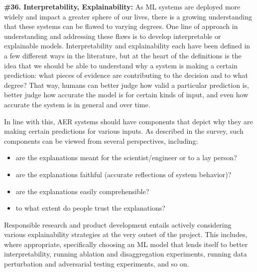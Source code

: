 \documentclass{clv3}
\begin{document}
\noindent \textbf{\#36. Interpretability, Explainability:} As ML systems are deployed more widely and impact a greater sphere of our lives, there is a growing understanding that these systems can be flawed to varying degrees. One line of approach in understanding and addressing these flaws is to develop interpretable or explainable models. Interpretability and explainability each have been defined in a few different ways in the literature, but at the heart of the definitions is the idea that we should be able to understand why a system is making a certain prediction: what pieces of evidence are contributing to the decision and to what degree? That way, humans can better judge how valid a particular prediction is, better judge how accurate the model is for certain kinds of input, and even how accurate the system is in general and over time.

In line with this, AER systems should have components that depict why they are making certain predictions for various inputs. 
As described in the \citet{luo2021local} survey,
such components can be viewed from several perspectives, including:\\[-20pt]
\begin{itemize}
    \item are the explanations meant for the scientist/engineer or to a lay person?
    \vspace*{-1mm}
    \item are the explanations faithful (accurate reflections of system behavior)?
    \vspace*{-1mm}
    \item are the explanations easily comprehensible?
    \vspace*{-1mm}
    \item to what extent do people trust the explanations?
\end{itemize}
\vspace*{-3mm}
\noindent Responsible research and product development entails actively considering various explainability strategies at the very outset of the project. This includes, where appropriate, specifically choosing an ML model that lends itself to better interpretability, running ablation and disaggregation experiments, running data perturbation and adversarial testing experiments, and so on.\\

\end{document}
